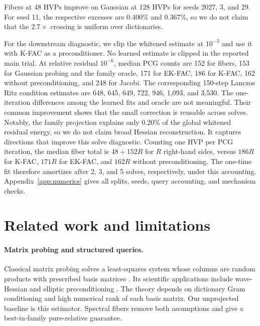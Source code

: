 \documentclass{article}
\theoremstyle{remark}
\newcommand{\1}{\mathbf 1}
\begin{document}
Fibers at 48 HVPs improve on Gaussian at 128 HVPs for seeds 2027, 3, and 29. For seed 11, the respective excesses are 0.400\% and 0.367\%, so we do not claim that the $2.7\times$ crossing is uniform over dictionaries.

For the downstream diagnostic, we clip the whitened estimate at $10^{-3}$ and use it with K-FAC as a preconditioner.  No learned estimate is clipped in the reported main trial.  At relative residual $10^{-6}$, median PCG counts are 152 for fibers, 153 for Gaussian probing and the family oracle, 171 for EK-FAC, 186 for K-FAC, 162 without preconditioning, and 248 for Jacobi.  The corresponding 150-step Lanczos Ritz condition estimates are 648, 645, 649, 722, 946, 1,093, and 3,530.  The one-iteration differences among the learned fits and oracle are not meaningful.  Their common improvement shows that the small correction is reusable across solves.  Notably, the family projection explains only 0.20\% of the global whitened residual energy, so we do not claim broad Hessian reconstruction.  It captures directions that improve this solve diagnostic. Counting one HVP per PCG iteration, the median fiber total is $48+152R$ for $R$ right-hand sides, versus $186R$ for K-FAC, $171R$ for EK-FAC, and $162R$ without preconditioning.  The one-time fit therefore amortizes after 2, 3, and 5 solves, respectively, under this accounting. Appendix~\ref{app:numerics} gives all splits, seeds, query accounting, and mechanism checks.

\section{Related work and limitations}
\label{sec:discussion}

\paragraph{Matrix probing and structured queries.}
Classical matrix probing solves a least-squares system whose columns are random products with prescribed basis matrices \citep{chiu2012probing}.  Its scientific applications include wave-Hessian and elliptic preconditioning \citep{chiu2012probing,demanet2012wave}.  The theory depends on dictionary Gram conditioning and high numerical rank of each basis matrix.  Our unprojected baseline is this estimator.  Spectral fibers remove both assumptions and give a best-in-family pure-relative guarantee.
\end{document}
